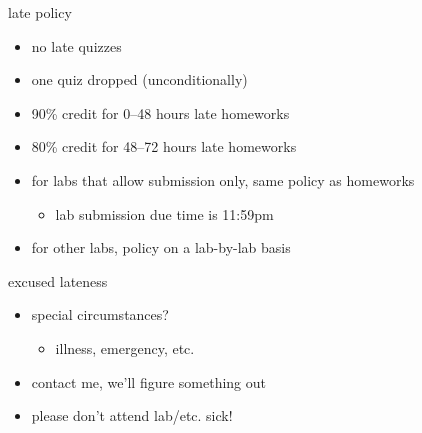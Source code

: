 
\begin{frame}{late policy}
    \begin{itemize}
    \item no late quizzes
    \item one quiz dropped (unconditionally)
    \vspace{.5cm}
    \item 90\% credit for 0--48 hours late homeworks
    \item 80\% credit for 48--72 hours late homeworks
    \vspace{.5cm}
    \item for labs that allow submission only, same policy as homeworks
        \begin{itemize}
        \item lab submission due time is 11:59pm
        \end{itemize}
    \item for other labs, policy on a lab-by-lab basis
    \end{itemize}
\end{frame}


\begin{frame}{excused lateness}
    \begin{itemize}
    \item special circumstances?
        \begin{itemize}
        \item illness, emergency, etc.
        \end{itemize}
    \item contact me, we'll figure something out
    \vspace{.5cm}
    \item please don't attend lab/etc. sick!
    \end{itemize}
\end{frame}
